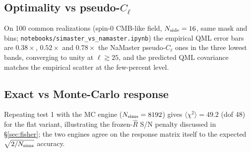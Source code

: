 \subsection{Optimality vs pseudo-$C_\ell$}
On 100 common realizations (spin-0 CMB-like field, $N_{\rm side}=16$, same mask and bins; \texttt{notebooks/simaster\_vs\_namaster.ipynb}) the empirical QML error bars are $0.38\times$, $0.52\times$ and $0.78\times$ the NaMaster pseudo-$C_\ell$ ones in the three lowest bands, converging to unity at $\ell\gtrsim25$, and the predicted QML covariance matches the empirical scatter at the few-percent level.

\subsection{Exact vs Monte-Carlo response}
Repeating test 1 with the MC engine ($N_{\rm sims}=8192$) gives $\langle\chi^2\rangle = 49.2$ (dof 48) for the flat variant, illustrating the frozen-$\hat R$ S/N penalty discussed in \S\ref{sec:fisher}; the two engines agree on the response matrix itself to the expected $\sqrt{2/N_{\rm sims}}$ accuracy.

